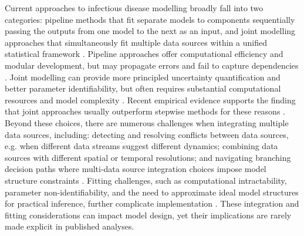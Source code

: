 \documentclass{article}
\begin{document}
Current approaches to infectious disease modelling broadly fall into two categories: pipeline methods that fit separate models to components sequentially passing the outputs from one model to the next as an input, and joint modelling approaches that simultaneously fit multiple data sources within a unified statistical framework \citep{deangelis2018analysing, russell2024combined}.
Pipeline approaches offer computational efficiency and modular development, but may propagate errors and fail to capture dependencies \citep{lison2024generative, Ward2024-sp}.
Joint modelling can provide more principled uncertainty quantification and better parameter identifiability, but often requires substantial computational resources and model complexity \citep{russell2024combined, lison2024generative}.
Recent empirical evidence supports the finding that joint approaches usually outperform stepwise methods for these reasons \citep{lison2024generative}.
Beyond these choices, there are numerous challenges when integrating multiple data sources, including: detecting and resolving conflicts between data sources, e.g. when different data streams suggest different dynamics; combining data sources with different spatial or temporal resolutions; and navigating branching decision paths where multi-data source integration choices impose model structure constraints \citep{deangelis2018analysing, nicholson2022interoperability}.
Fitting challenges, such as computational intractability, parameter non-identifiability, and the need to approximate ideal model structures for practical inference, further complicate implementation \citep{corbella2022inferring, Ward2024-sp}.
These integration and fitting considerations can impact model design, yet their implications are rarely made explicit in published analyses.
\end{document}
